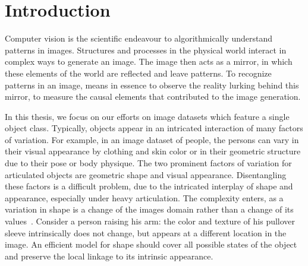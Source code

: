 \chapter{Introduction}\label{sec:introduction}
	Computer vision is the scientific endeavour to algorithmically understand patterns in images.
	Structures and processes in the physical world interact in complex ways to generate an image. The image then acts as a mirror, in which these elements of the world are reflected and leave patterns.
	To recognize patterns in an image, means in essence to observe the reality lurking behind this mirror, \ie to measure the causal elements that contributed to the image generation.


	In this thesis, we focus on our efforts on image datasets which feature a single object class.
	Typically, objects appear in an intricated interaction of many factors of variation.
	For example, in an image dataset of people, the persons can vary in their visual appearance by clothing and skin color or in their geometric structure due to their pose or body physique.
	The two prominent factors of variation for articulated objects are geometric shape and visual appearance.
	Disentangling these factors is a difficult problem, due to the intricated interplay of shape and appearance, especially under heavy articulation.
	The complexity enters, as a variation in shape is a change of the images domain rather than a change of its values~\cite{shu18shapeappear, xing18shapeappear}.
	Consider a person raising his arm: the color and texture of his pullover sleeve intrinsically does not change, but appears at a different location in the image. An efficient model for shape should cover all possible states of the object and preserve the local linkage to its intrinsic appearance.

